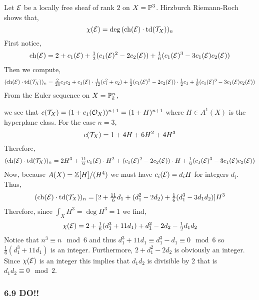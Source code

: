 \documentclass[12pt]{article}
\begin{document}
Let $\E$ be a locally free sheaf of rank $2$ on $X = \P^3$. Hirzburch Riemann-Roch shows that,
\[ \chi(\E) = \deg{(\ch{(\E)} \cdot \td{(\T_X)})_n} \]
First notice,
\[ \ch{(\E)} = 2 + c_1(\E) + \tfrac{1}{2} (c_1(\E)^2 - 2 c_2(\E)) + \tfrac{1}{6} (c_1(\E)^3 - 3 c_1(\E) c_2(\E)) \]
Then we compute,
\begin{align*}
(\ch{(\E)} \cdot \td{(\T_X)})_n = \tfrac{2}{24} c_1 c_2 + c_1(\E) \cdot \tfrac{1}{12}(c_1^2 + c_2) + \tfrac{1}{2} (c_1(\E)^2 - 2 c_2(\E)) \cdot \tfrac{1}{2} c_1 + \tfrac{1}{6} (c_1(\E)^3 - 3 c_1(\E) c_2(\E))
\end{align*}
From the Euler sequence on $X = \P^n_k$,
\begin{center}
\end{center}
we see that $c(\T_X) = (1 + c_1(\struct{X}))^{n+1} = (1 + H)^{n+1}$ where $H \in A^1(X)$ is the hyperplane class. For the case $n = 3$,
\[ c(\T_X) = 1 + 4 H + 6 H^2 + 4 H^3 \]
Therefore,
\[ (\ch{(\E)} \cdot \td{(\T_X)})_n = 2 H^3 + \tfrac{11}{6} c_1(\E) \cdot H^2 + (c_1(\E)^2 - 2 c_2(\E)) \cdot H + \tfrac{1}{6} (c_1(\E)^3 - 3 c_1(\E) c_2(\E)) \]
Now, because $A(X) = \Z[H]/(H^4)$ we must have $c_i(\E) = d_i H$ for integers $d_i$. Thus,
\[ (\ch{(\E)} \cdot \td{(\T_X)})_n = [2 + \tfrac{11}{6} d_1 + (d_1^2 - 2 d_2) + \tfrac{1}{6} (d_1^3 - 3 d_1 d_2)] H^3 \]
Therefore, since $\int_X H^3 = \deg{H^3} = 1$ we find,
\[ \chi(\E) = 2 + \tfrac{1}{6}(d_1^3 + 11 d_1) + d_1^2 - 2 d_2 - \tfrac{1}{2} d_1 d_2 \]
Notice that $n^3 \equiv n \mod 6$ and thus $d_1^3 + 11 d_1 \equiv d_1^3 - d_1 \equiv 0 \mod 6$ so $\tfrac{1}{6} (d_1^3 + 11 d_1)$ is an integer. Furthermore, $2 + d_1^2 - 2 d_2$ is obviously an integer. Since $\chi(\E)$ is an integer this implies that $d_1 d_2$ is divisible by $2$ that is $d_1 d_2 \equiv 0 \mod 2$.

\subsubsection{6.9 DO!!}
\end{document}

